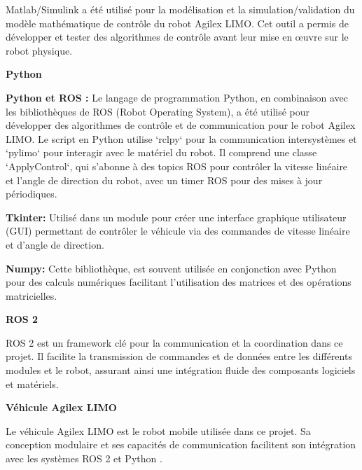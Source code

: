 Matlab/Simulink a été utilisé pour la modélisation et la simulation/validation du modèle mathématique de contrôle du robot Agilex LIMO. Cet outil a permis de développer et tester des algorithmes de contrôle avant leur mise en œuvre sur le robot physique.

\textbf{Python} 

\textbf{Python et ROS :} Le langage de programmation Python, en combinaison avec les bibliothèques de ROS (Robot Operating System), a été utilisé pour développer des algorithmes de contrôle et de communication pour le robot Agilex LIMO. Le script en Python utilise `rclpy` pour la communication intersystèmes et `pylimo` pour interagir avec le matériel du robot. Il comprend une classe `ApplyControl`, qui s'abonne à des topics ROS pour contrôler la vitesse linéaire et l'angle de direction du robot, avec un timer ROS pour des mises à jour périodiques.

\textbf{Tkinter:} Utilisé dans un module pour créer une interface graphique utilisateur (GUI) permettant de contrôler le véhicule via des commandes de vitesse linéaire et d'angle de direction.

\textbf{Numpy:} Cette bibliothèque, est souvent utilisée en conjonction avec Python pour des calculs numériques facilitant l'utilisation des matrices et des opérations matricielles.

\textbf{ROS 2}

ROS 2 \cite{ROS2} est un framework clé pour la communication et la coordination dans ce projet. Il facilite la transmission de commandes et de données entre les différents modules et le robot, assurant ainsi une intégration fluide des composants logiciels et matériels.

\textbf{Véhicule Agilex LIMO}

Le véhicule Agilex LIMO est le robot mobile utilisée dans ce projet. Sa conception modulaire et ses capacités de communication facilitent son intégration avec les systèmes ROS 2 et Python \cite{AgilexLIMO}.








